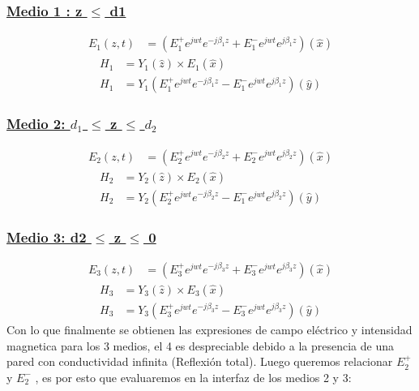 \documentclass[
  11pt,
  letterpaper,
   addpoints,
   answers
  ]{exam}
\begin{document}
\begin{questions}
\begin{solution}
\begin{enumerate}
            \subsubsection*{\underline{Medio 1 : z $\leq$ d1}}
            \begin{align}
                E_{1}(z,t) &= (E_{1}^{+}e^{jwt}e^{-j\beta_{1} z} + E_{1}^{-}e^{jwt}e^{j\beta_{1} z})(\hat{x})
            \end{align}
            \begin{align}
                 H_{1}&= Y_{1}(\hat{z}) \times E_{1}(\hat{x})\\
                    H_{1} &= Y_{1}(E_{1}^{+}e^{jwt}e^{-j\beta_{1} z} - E_{1}^{-}e^{jwt}e^{j\beta_{1} z}) (\hat{y})
            \end{align}
            \subsubsection*{\underline{Medio 2: 
            $d_{1}$ $\leq$ z $\leq$ $d_{2}$}}
            \begin{align}
                E_{2}(z,t) &= (E_{2}^{+}e^{jwt}e^{-j\beta_{2} z} + E_{2}^{-}e^{jwt}e^{j\beta_{2} z})(\hat{x})
            \end{align}
            \begin{align}
                 H_{2}&= Y_{2}(\hat{z}) \times E_{2}(\hat{x})\\
                    H_{2} &= Y_{2}(E_{2}^{+}e^{jwt}e^{-j\beta_{2} z} - E_{1}^{-}e^{jwt}e^{j\beta_{2} z}) (\hat{y})
            \end{align}
            \subsubsection*{\underline{Medio 3: d2 $\leq$ z  $\leq$ 0 }}
            \begin{align}
                E_{3}(z,t) &= (E_{3}^{+}e^{jwt}e^{-j\beta_{3} z} + E_{3}^{-}e^{jwt}e^{j\beta_{3} z})(\hat{x})
            \end{align}
            \begin{align}
                 H_{3}&= Y_{3}(\hat{z}) \times E_{3}(\hat{x})\\
                    H_{3} &= Y_{3}(E_{3}^{+}e^{jwt}e^{-j\beta_{3} z} - E_{3}^{-}e^{jwt}e^{j\beta_{3} z}) (\hat{y})
            \end{align}
            Con lo que finalmente se obtienen las expresiones de campo eléctrico y intensidad magnetica para los 3 medios, el 4 es despreciable debido a la presencia de una pared con conductividad infinita (Reflexión total). Luego queremos relacionar $E_{2}^{+}$ y $E_{2}^{-}$ , es por esto que evaluaremos en la interfaz de los medios 2 y 3:

\end{enumerate}
\end{solution}
\end{questions}
\end{document}
